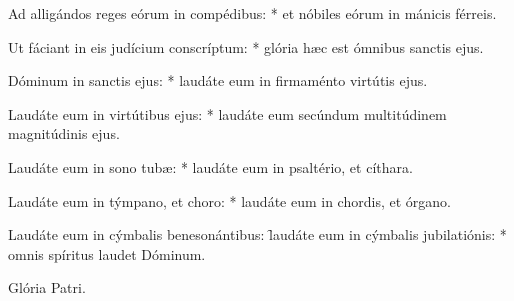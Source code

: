 \begin{psalmus}
Ad alligándos reges eórum in compédibus: * et nóbiles eórum in mánicis férreis.

Ut fáciant in eis judícium conscríptum: * glória hæc est ómnibus sanctis ejus.



 Dóminum in sanctis ejus: * laudáte eum in firmaménto virtútis ejus.

Laudáte eum in virtútibus ejus: * laudáte eum secúndum multitúdinem magnitúdinis ejus.

Laudáte eum in sono tubæ: * laudáte eum in psaltério, et cíthara.

Laudáte eum in týmpano, et choro: * laudáte eum in chordis, et órgano.

Laudáte eum in cýmbalis benesonántibus: \f laudáte eum in cýmbalis jubilatiónis: * omnis spíritus laudet Dóminum.

Glória Patri.

\end{psalmus}
